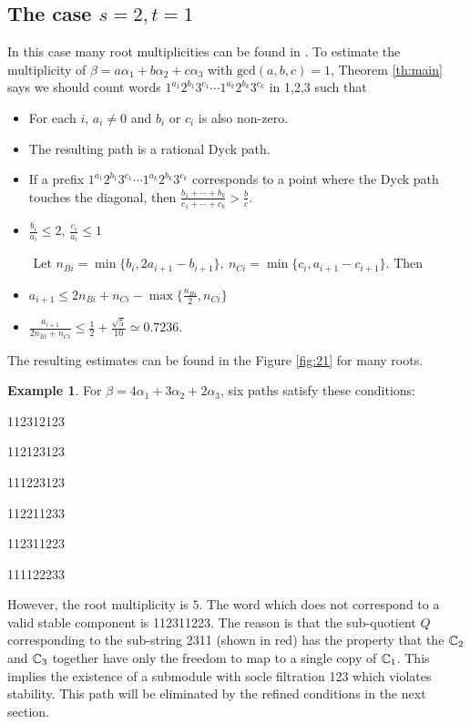 \documentclass{amsart}
\numberwithin{equation}{section}
\numberwithin{figure}{section}
\numberwithin{table}{section}
\theoremstyle{definition}
\newtheorem{Example}[equation]{Example}
\begin{document}
\subsection{The case $s=2,t=1$ }
In this case many root multiplicities can be found in \cite[Chapter 11]{Kac:1990}. To estimate the multiplicity of
$\beta= a \alpha_1+ b\alpha_2+c \alpha_3$ with $\text{gcd}(a,b,c)=1$, Theorem \ref{th:main} says we should count words  $1^{a_1} 2^{b_1}3^{c_1} \cdots 1^{a_k} 2^{b_k}3^{c_k}$ in 1,2,3 such that 
\begin{itemize}

\item  For each $i$, $a_i \neq 0$ and $b_i$ or $c_i$ is also non-zero.

\item The resulting path is a rational Dyck path.

\item  If a prefix $1^{a_1} 2^{b_1}3^{c_1} \cdots 1^{a_k} 2^{b_k}3^{c_k}$ corresponds to a point where the Dyck path touches the diagonal, then $\displaystyle  \frac{b_1+\cdots +b_k}{c_1+\cdots+c_k} >  \frac{b}{c}.$

\item $\displaystyle \frac{b_i}{a_i} \leq 2$, $\displaystyle \frac{c_i}{a_i} \leq 1$

\noindent $\mbox{}$ \hspace{-0.3in} Let $n_{Bi}=  \min \{ b_i, 2a_{i+1}-b_{i+1}\}, \ n_{Ci}=  \min \{ c_i,  a_{i+1}-c_{i+1}\}.$ Then 

\item  $\displaystyle a_{i+1} \leq 2 n_{Bi}+n_{Ci}- \max \{\frac{n_{Bi}}{2} , n_{Ci} \}$ \  

\item $\displaystyle \frac{a_{i+1}}{2n_{Bi}+n_{Ci}} \leq \frac{1}{2}+\frac{\sqrt{5}}{10} \simeq 0.7236$.

\end{itemize}

\noindent The resulting estimates can be found in the Figure \ref{fig:21} for many roots.


\begin{Example}
For $\beta=4\alpha_1+3 \alpha_2+2\alpha_3$, six paths satisfy these conditions:

112312123

112123123

111223123

112211233

112311223

111122233

\noindent However, the root multiplicity is $5$. The word which does not correspond to a valid stable component is 
11{\color{red}2311}223. 
The reason is that the sub-quotient $Q$ corresponding to the sub-string 2311 (shown in red) has the property that the ${\Bbb C}_2$ and ${\Bbb C}_3$ together have only the freedom to map to a single copy of ${\Bbb C}_1$. This implies the existence of a submodule with socle filtration 123 which violates stability. This path will be eliminated by the refined conditions in the next section. 
\end{Example}
\end{document}
